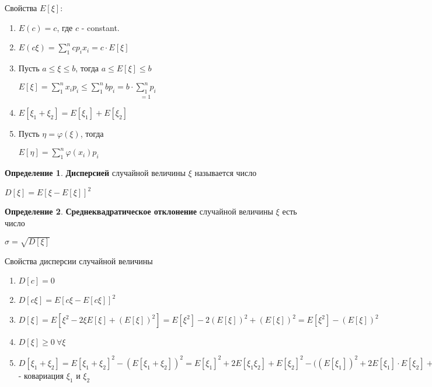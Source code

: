 \documentclass[a4paper, 12pt]{article}
\theoremstyle{definition}
\newtheorem{Definition}{Определение}
\begin{document}
    \begin{center}
        Свойства \(E[\xi]\):
        \begin{enumerate}
            \item
                \(E(c) = c\), где \(c\) - constant.
            \item
                \(E(c\xi) = \sum^{n}_{1} c p_i x_i = c \cdot E[\xi]\)
            \item
                Пусть \(a \le \xi \le b\), тогда \(a \le E[\xi] \le b\)

                \(E[\xi] = \sum^{n}_{1} x_i p_i \le \sum^{n}_{1} b p_i = b \cdot \underset{= 1}{\sum^{n}_{1} p_i}\)
            \item
                \(E[\xi_1 + \xi_2] = E[\xi_1] + E[\xi_2]\)
            \item
                Пусть \(\eta = \varphi(\xi)\), тогда


                \(E[\eta] = \sum^{n}_{1} \varphi(x_i) p_i\)
        \end{enumerate}
    \end{center}

    \begin{Definition}
        \textbf{Дисперсией} случайной величины \(\xi\) называется число

        \(D[\xi] = E{[\xi - E{[\xi]}]^2}\)
    \end{Definition}

    \begin{Definition}
        \textbf{Среднеквадратическое отклонение} случайной величины \(\xi\) есть число

        \(\sigma = \sqrt{D[\xi]}\)
    \end{Definition}

    \begin{center}
        Свойства дисперсии случайной величины

        \begin{enumerate}
            \item
                \(D[c] = 0\)
            \item
                \(D[c \xi] = E{[c \xi - E{[c \xi]} ]^2}\)
            \item
                \(D[\xi] = E{[\xi^2 - 2 \xi E{[\xi]} + ( E{[\xi]} )^2]} =
                E[\xi^2] - 2(E[\xi])^2 + (E[\xi])^2 = E[\xi^2] - (E[\xi])^2\)
            \item
                \(D[\xi] \ge 0 \ \forall \xi\)
            \item
                \(D[\xi_1 + \xi_2] = E[\xi_1 + \xi_2]^2 - ( E[\xi_1 + \xi_2] )^2 =
                E[\xi_1]^2 + 2E[\xi_1 \xi_2] + E[\xi_2]^2 - \big( (E[\xi_1])^2 + 2E[\xi_1] \cdot E[\xi_2] + (E[\xi_2])^2 \big) = 
                D[\xi_1] + D[\xi_2] + 2 (E[\xi_1 \xi_2] - E[\xi_1] \cdot E[\xi_2]) = cov(\xi_1, \xi_2)\) - ковариация \(\xi_1\) и \(\xi_2\)
        \end{enumerate}
    \end{center}
\end{document}
